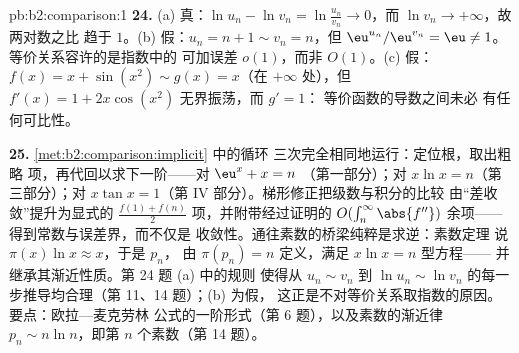 \begin{solution}{pb:b2:comparison:1}
\textbf{24.} (a) 真：$\ln u_n - \ln v_n = \ln\frac{u_n}{v_n}
\to 0$，而 $\ln v_n \to +\infty$，故两对数之比
趋于 $1$。(b) 假：$u_n = n + 1 \sim v_n = n$，但
$\eu^{u_n}/\eu^{v_n} = \eu \neq 1$。等价关系容许的是指数中的
可加误差 $o(1)$，而非 $O(1)$。(c) 假：
$f(x) = x + \sin(x^2) \sim g(x) = x$（在 $+\infty$ 处），但 $f'(x)
= 1 + 2x\cos(x^2)$ 无界振荡，而 $g' = 1$：
等价函数的导数之间未必
有任何可比性。

\textbf{25.} \cref{met:b2:comparison:implicit} 中的循环
三次完全相同地运行：定位根，取出粗略
项，再代回以求下一阶——对 $\eu^x + x = n$
（第一部分）；对 $x\ln x = n$（第三部分）；对 $x\tan x = 1$（第
IV 部分）。梯形修正把级数与积分的比较
由“差收敛”提升为显式的
$\frac{f(1) + f(n)}2$ 项，并附带经过证明的 $O(\int_n^\infty
\abs{f''})$ 余项——得到常数与误差界，而不仅是
收敛性。通往素数的桥梁纯粹是求逆：素数定理
说 $\pi(x)\ln x \approx x$，于是 $p_n$，
由 $\pi(p_n) = n$ 定义，满足 $x\ln x = n$ 型方程——
并继承其渐近性质。第 24 题 (a) 中的规则
使得从 $u_n \sim v_n$ 到 $\ln u_n \sim
\ln v_n$ 的每一步推导均合理（第 11、14 题）；(b) 为假，
这正是不对等价关系取指数的原因。要点：欧拉—麦克劳林
公式的一阶形式（第 6 题），以及素数的渐近律
$p_n \sim n\ln n$，即第 $n$ 个素数（第 14 题）。
\end{solution}
